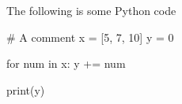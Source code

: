 \documentclass[11pt]{article}
\begin{document}
The following is some Python code

\begin{python}
# A comment
x = [5, 7, 10]
y = 0

for num in x:
    y += num
    
print(y)
\end{python}
\end{document}
